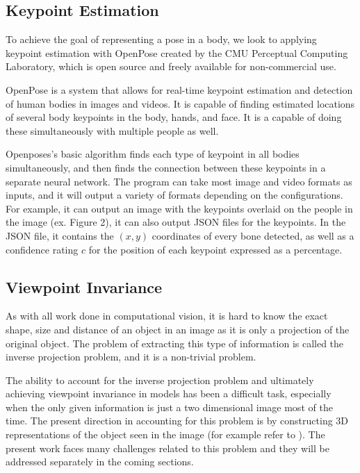 \documentclass{article}
\begin{document}
\subsection{Keypoint Estimation}

To achieve the goal of representing a pose in a body, we look to applying keypoint estimation with OpenPose \citep{cao2017realtime} \citep{simon2017hand} \citep{wei2016cpm} created by the CMU Perceptual Computing Laboratory, which is open source and freely available for non-commercial use. 

OpenPose is a system that allows for real-time keypoint estimation and detection of human bodies in images and videos. It is capable of finding estimated locations of several body keypoints in the body, hands, and face. It is a capable of doing these simultaneously with multiple people as well. 

Openposes’s	 basic algorithm finds each type of keypoint in all bodies simultaneously, and then finds the connection between these keypoints in a separate neural network. The program can take most image and video formats as inputs, and it will output a variety of formats depending on the configurations. For example, it can output an image with the keypoints overlaid on the people in the image (ex. Figure 2), it can also output JSON files for the keypoints. In the JSON file, it contains the $(x,y)$ coordinates of every bone detected, as well as a confidence rating $c$ for the position of each keypoint expressed as a percentage.

\subsection{Viewpoint Invariance}

As with all work done in computational vision, it is hard to know the exact shape, size and distance of an object in an image as it is only a projection of the original object. The problem of extracting this type of information is called the inverse projection problem, and it is a non-trivial problem.

The ability to account for the inverse projection problem and ultimately achieving viewpoint invariance in models has been a difficult task, especially when the only given information is just a two dimensional image most of the time. The present direction in accounting for this problem is by constructing 3D representations of the object seen in the image (for example refer to \citep{shin2018pixels} ). The present work faces many challenges related to this problem and they will be addressed separately in the coming sections.
\end{document}
